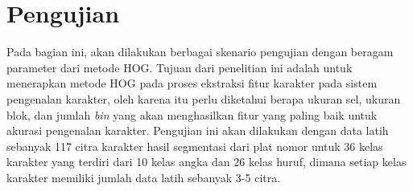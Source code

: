 
\section{Pengujian}
\noindent Pada bagian ini, akan dilakukan berbagai skenario pengujian dengan beragam parameter dari metode HOG. Tujuan dari penelitian ini adalah untuk menerapkan metode HOG pada proses ekstraksi fitur karakter pada sistem pengenalan karakter, oleh karena itu perlu diketahui berapa ukuran sel, ukuran blok, dan jumlah \textit{bin} yang akan menghasilkan fitur yang paling baik untuk akurasi pengenalan karakter. Pengujian ini akan dilakukan dengan data latih sebanyak 117 citra karakter hasil segmentasi dari plat nomor untuk 36 kelas karakter yang terdiri dari 10 kelas angka dan 26 kelas huruf, dimana setiap kelas karakter memiliki jumlah data latih sebanyak 3-5 citra.\\

